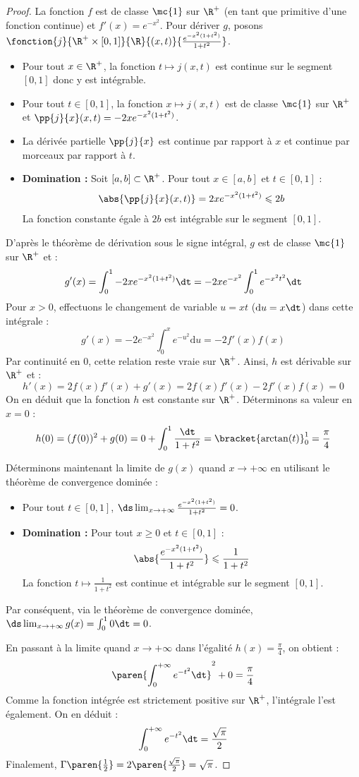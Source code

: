 \begin{proof}
    La fonction $f$ est de classe $\mc{1}$ sur $\R^+$ (en tant que primitive d'une fonction continue) et $f'(x) = e^{-x^2}$.
    Pour dériver $g$, posons $\fonction{j}{\R^+ \times [0,1]}{\R}{(x,t)}{\frac{e^{-x^2(1+t^2)}}{1+t^2}}$.
    \begin{itemize}
        \item Pour tout $x \in \R^+$, la fonction $t \mapsto j(x,t)$ est continue sur le segment $[0,1]$ donc y est intégrable.
        \item Pour tout $t \in [0,1]$, la fonction $x \mapsto j(x,t)$ est de classe $\mc{1}$ sur $\R^+$ et $\pp{j}{x}(x,t) = -2x e^{-x^2(1+t^2)}$.
        \item La dérivée partielle $\pp{j}{x}$ est continue par rapport à $x$ et continue par morceaux par rapport à $t$.
        \item \textbf{Domination :} Soit $[a,b] \subset \R^+$. Pour tout $x \in [a,b]$ et $t \in [0,1]$ :
        \[ \abs{\pp{j}{x}(x,t)} = 2x e^{-x^2(1+t^2)} \leqslant 2b \]
        La fonction constante égale à $2b$ est intégrable sur le segment $[0,1]$.
    \end{itemize}
    D'après le théorème de dérivation sous le signe intégral, $g$ est de classe $\mc{1}$ sur $\R^+$ et :
    \[ g'(x) = \int_0^1 -2x e^{-x^2(1+t^2)} \dt = -2x e^{-x^2} \int_0^1 e^{-x^2 t^2} \dt \]
    Pour $x > 0$, effectuons le changement de variable $u = xt$ ($\mathrm{d}u = x\dt$) dans cette intégrale :
    \[ g'(x) = -2 e^{-x^2} \int_0^x e^{-u^2} \mathrm{d}u = -2 f'(x) f(x) \]
    Par continuité en $0$, cette relation reste vraie sur $\R^+$.
    Ainsi, $h$ est dérivable sur $\R^+$ et :
    \[ h'(x) = 2 f(x) f'(x) + g'(x) = 2 f(x) f'(x) - 2 f'(x) f(x) = 0 \]
    On en déduit que la fonction $h$ est constante sur $\R^+$. Déterminons sa valeur en $x=0$ :
    \[ h(0) = (f(0))^2 + g(0) = 0 + \int_0^1 \frac{\dt}{1+t^2} = \bracket{\arctan(t)}_0^1 = \frac{\pi}{4} \]

    Déterminons maintenant la limite de $g(x)$ quand $x \to +\infty$ en utilisant le théorème de convergence dominée :
    \begin{itemize}
        \item Pour tout $t \in [0,1]$, $\ds\lim_{x \to +\infty} \frac{e^{-x^2(1+t^2)}}{1+t^2} = 0$.
        \item \textbf{Domination :} Pour tout $x \geqslant 0$ et $t \in [0,1]$ :
        \[ \abs{\frac{e^{-x^2(1+t^2)}}{1+t^2}} \leqslant \frac{1}{1+t^2} \]
        La fonction $t \mapsto \frac{1}{1+t^2}$ est continue et intégrable sur le segment $[0,1]$.
    \end{itemize}
    Par conséquent, via le théorème de convergence dominée, $\ds\lim_{x \to +\infty} g(x) = \int_0^1 0 \dt = 0$.

    En passant à la limite quand $x \to +\infty$ dans l'égalité $h(x) = \frac{\pi}{4}$, on obtient :
    \[ \paren{\int_0^{+\infty} e^{-t^2} \dt}^2 + 0 = \frac{\pi}{4} \]
    Comme la fonction intégrée est strictement positive sur $\R^+$, l'intégrale l'est également. On en déduit :
    \[ \int_0^{+\infty} e^{-t^2} \dt = \frac{\sqrt{\pi}}{2} \]
    Finalement, $\Gamma\paren{\frac{1}{2}} = 2 \paren{\frac{\sqrt{\pi}}{2}} = \sqrt{\pi}$.
\end{proof}
